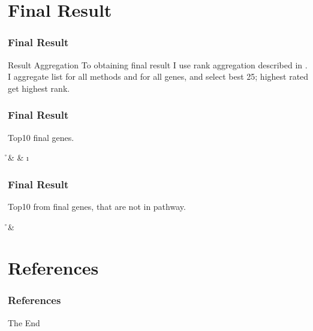 \documentclass{beamer}
\begin{document}
\section{Final Result}
\begin{frame}
\frametitle{Final Result}

\begin{block}{Result Aggregation}
To obtaining final result I use rank aggregation described in \cite{rang_aggr}. I aggregate list for all methods and for all genes, and select best 25; highest rated get highest rank. 
\end{block}
\end{frame}


\begin{frame}
\frametitle{Final Result}
\begin{table}
\centering
\caption{Top10 final genes.}
\label{table:selectedTop10}
%
{\r & \g & \i}%
\end{table}
\end{frame}


\begin{frame}
\frametitle{Final Result}
\begin{table}
\centering
\caption{Top10 from final genes, that are not in pathway.}
\label{table:selectedNotPathway}
%
{\r & \g}%
\end{table}
\end{frame}
\section{References}
\begin{frame}
\frametitle{References}




\end{frame}


\begin{frame}
\Huge{\centerline{The End}}
\end{frame}

\end{document}
